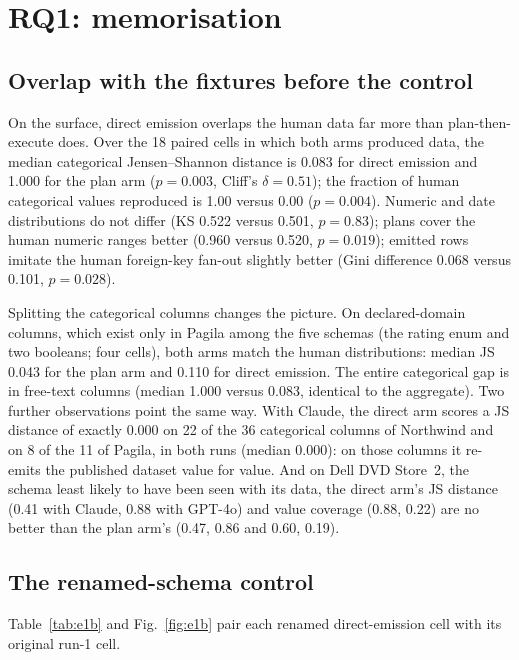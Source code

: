 \documentclass[preprint,12pt]{elsarticle}
\begin{document}
\section{RQ1: memorisation}
\label{sec:rq1}

\subsection{Overlap with the fixtures before the control}
\label{sec:fidelity}
On the surface, direct emission overlaps the human data far more than plan-then-execute does. Over the 18 paired cells in which both arms produced data, the median categorical Jensen--Shannon distance is 0.083 for direct emission and 1.000 for the plan arm ($p=0.003$, Cliff's $\delta=0.51$); the fraction of human categorical values reproduced is 1.00 versus 0.00 ($p=0.004$). Numeric and date distributions do not differ (KS 0.522 versus 0.501, $p=0.83$); plans cover the human numeric ranges better (0.960 versus 0.520, $p=0.019$); emitted rows imitate the human foreign-key fan-out slightly better (Gini difference 0.068 versus 0.101, $p=0.028$).

Splitting the categorical columns changes the picture. On declared-domain columns, which exist only in Pagila among the five schemas (the rating enum and two booleans; four cells), both arms match the human distributions: median JS 0.043 for the plan arm and 0.110 for direct emission. The entire categorical gap is in free-text columns (median 1.000 versus 0.083, identical to the aggregate). Two further observations point the same way. With Claude, the direct arm scores a JS distance of exactly 0.000 on 22 of the 36 categorical columns of Northwind and on 8 of the 11 of Pagila, in both runs (median 0.000): on those columns it re-emits the published dataset value for value. And on Dell DVD Store~2, the schema least likely to have been seen with its data, the direct arm's JS distance (0.41 with Claude, 0.88 with GPT-4o) and value coverage (0.88, 0.22) are no better than the plan arm's (0.47, 0.86 and 0.60, 0.19).

\subsection{The renamed-schema control}
\label{sec:e1b}
Table~\ref{tab:e1b} and Fig.~\ref{fig:e1b} pair each renamed direct-emission cell with its original run-1 cell.
\end{document}
